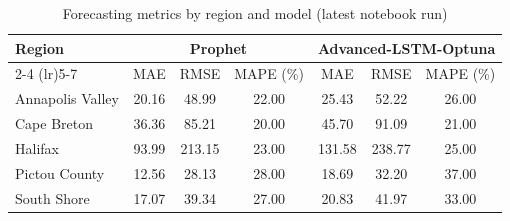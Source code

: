 \begin{table}[H]
\centering
\caption{Forecasting metrics by region and model (latest notebook run)}
\label{tab:app_forecast_metrics}
\begin{tabular}{lccc|ccc}
\toprule
\multirow{2}{*}{Region} & \multicolumn{3}{c|}{Prophet} & \multicolumn{3}{c}{Advanced-LSTM-Optuna} \\
\cmidrule(lr){2-4} \cmidrule(lr){5-7}
& MAE & RMSE & MAPE (\%) & MAE & RMSE & MAPE (\%) \\
\midrule
Annapolis Valley & 20.16 & 48.99 & 22.00 & 25.43 & 52.22 & 26.00 \\
Cape Breton      & 36.36 & 85.21 & 20.00 & 45.70 & 91.09 & 21.00 \\
Halifax          & 93.99 & 213.15 & 23.00 & 131.58 & 238.77 & 25.00 \\
Pictou County    & 12.56 & 28.13 & 28.00 & 18.69 & 32.20 & 37.00 \\
South Shore      & 17.07 & 39.34 & 27.00 & 20.83 & 41.97 & 33.00 \\
\bottomrule
\end{tabular}
\end{table}